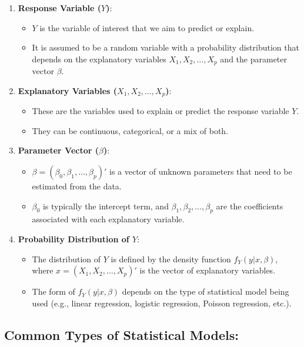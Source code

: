 \documentclass{article}
\begin{document}
\begin{enumerate}
    \item \textbf{Response Variable (\( Y \))}:
    \begin{itemize}
        \item \( Y \) is the variable of interest that we aim to predict or explain.
        \item It is assumed to be a random variable with a probability distribution that depends on the explanatory variables \( X_1, X_2, \dots, X_p \) and the parameter vector \( \beta \).
    \end{itemize}

    \item \textbf{Explanatory Variables (\( X_1, X_2, \dots, X_p \))}:
    \begin{itemize}
        \item These are the variables used to explain or predict the response variable \( Y \).
        \item They can be continuous, categorical, or a mix of both.
    \end{itemize}

    \item \textbf{Parameter Vector (\( \beta \))}:
    \begin{itemize}
        \item \( \beta = (\beta_0, \beta_1, \dots, \beta_p)' \) is a vector of unknown parameters that need to be estimated from the data.
        \item \( \beta_0 \) is typically the intercept term, and \( \beta_1, \beta_2, \dots, \beta_p \) are the coefficients associated with each explanatory variable.
    \end{itemize}

    \item \textbf{Probability Distribution of \( Y \)}:
    \begin{itemize}
        \item The distribution of \( Y \) is defined by the density function \( f_Y(y | x, \beta) \), where \( x = (X_1, X_2, \dots, X_p)' \) is the vector of explanatory variables.
        \item The form of \( f_Y(y | x, \beta) \) depends on the type of statistical model being used (e.g., linear regression, logistic regression, Poisson regression, etc.).
    \end{itemize}
\end{enumerate}

\subsection*{Common Types of Statistical Models:}
\end{document}
